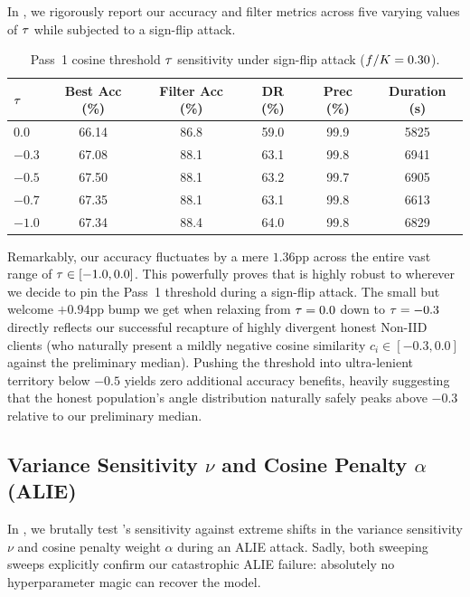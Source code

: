 \documentclass[../main.tex]{subfiles}
\begin{document}
In , we rigorously report our accuracy and filter metrics across five varying values of $\taucosine$ while subjected to a sign-flip attack.

\begin{table}[htbp]
\centering
\caption[Pass~1 cosine threshold $\taucosine$ sensitivity under sign-flip attack ($f/\nclients=0.30$)]{Pass~1 cosine threshold $\taucosine$ sensitivity under sign-flip attack ($f/\nclients=0.30$).}
\label{tab:tau_cos_sweep}
\begin{tabular}{lccccc}
\toprule
$\taucosine$ & \textbf{Best Acc (\%)} & \textbf{Filter Acc (\%)} & \textbf{DR (\%)} & \textbf{Prec (\%)} & \textbf{Duration (s)} \\
\midrule
$0.0$         & 66.14 & 86.8 & 59.0 & 99.9 & 5825 \\
$-0.3$         & 67.08 & 88.1 & 63.1 & 99.8 & 6941 \\
$-0.5$        & 67.50 & 88.1 & 63.2 & 99.7 & 6905 \\
$-0.7$        & 67.35 & 88.1 & 63.1 & 99.8 & 6613 \\
$-1.0$        & 67.34 & 88.4 & 64.0 & 99.8 & 6829 \\
\bottomrule
\end{tabular}
\end{table}

Remarkably, our accuracy fluctuates by a mere $1.36$pp across the entire vast range of $\tau \in [-1.0, 0.0]$. This powerfully proves that \aegis{} is highly robust to wherever we decide to pin the Pass~1 threshold during a sign-flip attack. The small but welcome $+0.94$pp bump we get when relaxing from $\tau=0.0$ down to $\tau=-0.3$ directly reflects our successful recapture of highly divergent honest Non-IID clients (who naturally present a mildly negative cosine similarity $c_i \in [-0.3, 0.0]$ against the preliminary median). Pushing the threshold into ultra-lenient territory below $-0.5$ yields zero additional accuracy benefits, heavily suggesting that the honest population's angle distribution naturally safely peaks above $-0.3$ relative to our preliminary median.

\subsection{Variance Sensitivity \texorpdfstring{$\nu$}{nu} and Cosine Penalty \texorpdfstring{$\alpha$}{alpha} (ALIE)}
\label{sec:results_alie_sweep}

In , we brutally test \aegis{}'s sensitivity against extreme shifts in the variance sensitivity $\nu$ and cosine penalty weight $\alpha$ during an ALIE attack. Sadly, both sweeping sweeps explicitly confirm our catastrophic ALIE failure: absolutely no hyperparameter magic can recover the model.
\end{document}

